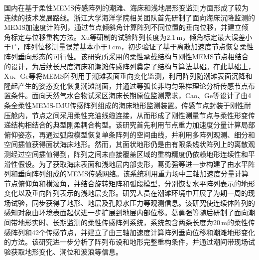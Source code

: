 国内在基于柔性MEMS传感阵列的潮滩、海床和浅地层形变监测方面形成了较为连续的技术发展路线。浙江大学海洋学院相关团队首先研制了面向海床沉降监测的MEMS加速度计阵列，通过节点倾斜角计算阵列不同位置的垂向位移，并建立倾角标定与位移重构方法。Xu等研制的试验阵列长度为$2.1\,\mathrm{m}$，倾角标定最大误差小于$1^\circ$，阵列位移测量误差基本小于$1\,\mathrm{cm}$，初步验证了基于离散加速度节点恢复柔性阵列垂向形态的可行性\cite{xu2018memsarray}。该研究所采用的柔性承载结构与刚性MEMS节点相结合的设计，为后续长尺度海床和潮滩传感阵列奠定了结构与算法基础。在此基础上，Xu、Ge等将MEMS阵列用于潮滩表面垂向变化监测，利用阵列随潮滩表面沉降和隆起产生的姿态变化恢复潮滩剖面，并通过等弧长非均匀采样理论分析传感节点布置条件\cite{xu2020tidalflat}。面向天然气水合物试采区海床长期原位监测需求，Cao、Ge等设计了由4条全柔性MEMS-IMU传感阵列组成的海床地形监测装置\cite{cao2022longterm}。传感节点封装于刚性耐压舱内，节点之间采用柔性充油线缆连接，从而形成了刚性测量节点与柔性形变传递结构相结合的典型刚柔耦合构型。该研究首先利用节点重力加速度分量计算局部俯仰姿态，再通过弧段模型恢复单条阵列的空间曲线，并利用多阵列观测、细分和空间插值获得面状海床地形。然而，其面状地形仍是由有限条线状阵列上的离散观测经过空间插值得到，阵列之间未直接覆盖区域的重构精度仍依赖地形连续性和平滑性假设。为了获取海床表面和浅地层内部变形，葛勇强等进一步构建了由水平阵列和垂向阵列组成的MEMS传感网络\cite{ge2022memsnetwork}。该系统利用重力场中三轴加速度分量计算节点俯仰角和横滚角，并结合旋转矩阵和弧段模型，分别恢复水平阵列表示的地形变化以及垂向阵列表示的浅地层变形。研究人员在潮滩环境中开展了为期一周的现场试验，同步获得了地形、地层及孔隙水压力等观测信息。该研究使连续体阵列的感知对象由环境表面起伏进一步扩展到地层内部位移。葛勇强等随后研制了面向潮间带地形实时、长期监测的柔性传感阵列系统，系统包含两条长度为$20\,\mathrm{m}$的柔性传感阵列和42个传感节点，并建立了由三轴加速度计算阵列垂向位移和潮滩地形变化的方法\cite{ge2024intertidal}。该研究进一步分析了阵列布设和地形完整重构条件，并通过潮间带现场试验获取地形变化、潮位和波浪等信息。

